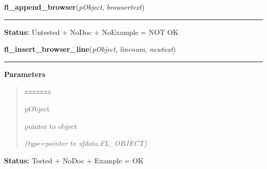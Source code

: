     \vspace{0.5ex}

\hspace{.8\funcindent}\begin{boxedminipage}{\funcwidth}

    \raggedright \textbf{fl\_append\_browser}(\textit{pObject}, \textit{browsertext})

    \vspace{-1.5ex}

    \rule{\textwidth}{0.5\fboxrule}
\setlength{\parskip}{2ex}
\setlength{\parskip}{1ex}
\textbf{Status:} Untested + NoDoc + NoExample = NOT OK



    \end{boxedminipage}

    \label{xformslib:library:fl_insert_browser_line}

    \vspace{0.5ex}

\hspace{.8\funcindent}\begin{boxedminipage}{\funcwidth}

    \raggedright \textbf{fl\_insert\_browser\_line}(\textit{pObject}, \textit{linenum}, \textit{newtext})

    \vspace{-1.5ex}

    \rule{\textwidth}{0.5\fboxrule}
\setlength{\parskip}{2ex}
\setlength{\parskip}{1ex}
      \textbf{Parameters}
      \vspace{-1ex}

      \begin{quote}
        \begin{Ventry}{xxxxxxx}

          \item[pObject]

          pointer to object

            {\it (type=pointer to xfdata.FL\_OBJECT)}

        \end{Ventry}

      \end{quote}

\textbf{Status:} Tested + NoDoc + Example = OK



    \end{boxedminipage}

